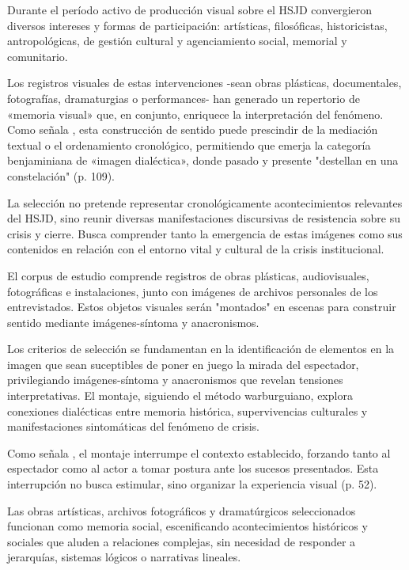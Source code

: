 Durante el período activo de producción visual sobre el HSJD convergieron diversos intereses y formas de participación: artísticas, filosóficas, historicistas, antropológicas, de gestión cultural y agenciamiento social, memorial y comunitario.

Los registros visuales de estas intervenciones -sean obras plásticas, documentales, fotografías, dramaturgias o performances- han generado un repertorio de «memoria visual» que, en conjunto, enriquece la interpretación del fenómeno. Como señala \parencite{Abril2007}, esta construcción de sentido puede prescindir de la mediación textual o el ordenamiento cronológico, permitiendo que emerja la categoría benjaminiana de «imagen dialéctica», donde pasado y presente "destellan en una constelación" (p. 109).

La selección no pretende representar cronológicamente acontecimientos relevantes del HSJD, sino reunir diversas manifestaciones discursivas de resistencia sobre su crisis y cierre. Busca comprender tanto la emergencia de estas imágenes como sus contenidos en relación con el entorno vital y cultural de la crisis institucional.

El corpus de estudio comprende registros de obras plásticas, audiovisuales, fotográficas e instalaciones, junto con imágenes de archivos personales de los entrevistados. Estos objetos visuales serán "montados" en escenas para construir sentido mediante imágenes-síntoma y anacronismos.

\textcolor{edit30sept}{Los criterios de selección se fundamentan en la identificación de elementos en la imagen que sean suceptibles de poner en juego la mirada del espectador, privilegiando imágenes-síntoma y anacronismos que revelan tensiones interpretativas. El montaje, siguiendo el método warburguiano, explora conexiones dialécticas entre memoria histórica, supervivencias culturales y manifestaciones sintomáticas del fenómeno de crisis.}

Como señala \parencite{Benjamin2004}, el montaje interrumpe el contexto establecido, forzando tanto al espectador como al actor a tomar postura ante los sucesos presentados. Esta interrupción no busca estimular, sino organizar la experiencia visual (p. 52).

Las obras artísticas, archivos fotográficos y dramatúrgicos seleccionados funcionan como memoria social, escenificando acontecimientos históricos y sociales que aluden a relaciones complejas, sin necesidad de responder a jerarquías, sistemas lógicos o narrativas lineales.

